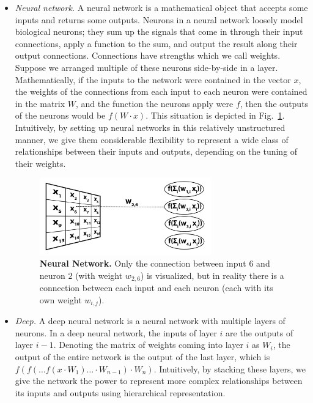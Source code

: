 \documentclass[10pt,letterpaper]{article}
\begin{document}
            \begin{itemize}
                \item
                    \textit{Neural network.} A neural network is a mathematical object that accepts some inputs and returns some outputs. Neurons in a neural network loosely model biological neurons; they sum up the signals that come in through their input connections, apply a function to the sum, and output the result along their output connections. Connections have strengths which we call weights. Suppose we arranged multiple of these neurons side-by-side in a layer. Mathematically, if the inputs to the network were contained in the vector $x$, the weights of the connections from each input to each neuron were contained in the matrix $W$, and the function the neurons apply were $f$, then the outputs of the neurons would be $f(W \cdot x)$. This situation is depicted in Fig.~\ref{dcnn_neural_network}. Intuitively, by setting up neural networks in this relatively unstructured manner, we give them considerable flexibility to represent a wide class of relationships between their inputs and outputs, depending on the tuning of their weights.
            
                    \begin{figure}[h]
                        \includegraphics[width=0.7\textwidth]{dcnn_neural_net}
                        \caption{{\bf Neural Network.} Only the connection between input $6$ and neuron $2$ (with weight $w_{2, 6}$) is visualized, but in reality there is a connection between each input and each neuron (each with its own weight $w_{i, j}$).}
                        \label{dcnn_neural_network}
                    \end{figure}
            
                \item
                    \textit{Deep.}
                        A deep neural network is a neural network with multiple layers of neurons. In a deep neural network, the inputs of layer $i$ are the outputs of layer $i - 1$. Denoting the matrix of weights coming into layer $i$ as $W_i$, the output of the entire network is the output of the last layer, which is $f(f(\ldots f(x \cdot W_1) \ldots \cdot W_{n-1}) \cdot W_n)$. Intuitively, by stacking these layers, we give the network the power to represent more complex relationships between its inputs and outputs using hierarchical representation.
            

\end{itemize}
\end{document}
